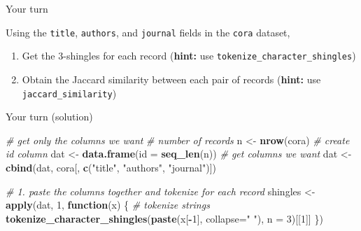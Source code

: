 \documentclass[
  ignorenonframetext,
]{beamer}
\newenvironment{Shaded}{\begin{snugshade}}{\end{snugshade}}
\newcommand{\CommentTok}[1]{\textcolor[rgb]{0.56,0.35,0.01}{\textit{#1}}}
\newcommand{\ControlFlowTok}[1]{\textcolor[rgb]{0.13,0.29,0.53}{\textbf{#1}}}
\newcommand{\DataTypeTok}[1]{\textcolor[rgb]{0.13,0.29,0.53}{#1}}
\newcommand{\DecValTok}[1]{\textcolor[rgb]{0.00,0.00,0.81}{#1}}
\newcommand{\KeywordTok}[1]{\textcolor[rgb]{0.13,0.29,0.53}{\textbf{#1}}}
\newcommand{\NormalTok}[1]{#1}
\newcommand{\OperatorTok}[1]{\textcolor[rgb]{0.81,0.36,0.00}{\textbf{#1}}}
\newcommand{\StringTok}[1]{\textcolor[rgb]{0.31,0.60,0.02}{#1}}
\providecommand{\tightlist}{%
  \setlength{\itemsep}{0pt}\setlength{\parskip}{0pt}}
\begin{document}
\begin{frame}[fragile]{Your turn}
\protect\hypertarget{your-turn-1}{}

Using the \texttt{title}, \texttt{authors}, and \texttt{journal} fields
in the \texttt{cora} dataset,

\vfill

\begin{enumerate}
\tightlist
\item
  Get the \(3\)-shingles for each record (\textbf{hint:} use
  \texttt{tokenize\_character\_shingles}) \vfill
\item
  Obtain the Jaccard similarity between each pair of records
  (\textbf{hint:} use \texttt{jaccard\_similarity}) \vfill
\end{enumerate}

\end{frame}

\begin{frame}[fragile]{Your turn (solution)}
\protect\hypertarget{your-turn-solution-1}{}

\small

\begin{Shaded}
\begin{Highlighting}[]
\CommentTok{# get only the columns we want}
\CommentTok{# number of records}
\NormalTok{n <-}\StringTok{ }\KeywordTok{nrow}\NormalTok{(cora) }
\CommentTok{# create id column}
\NormalTok{dat <-}\StringTok{ }\KeywordTok{data.frame}\NormalTok{(}\DataTypeTok{id =} \KeywordTok{seq_len}\NormalTok{(n)) }
\CommentTok{# get columns we want}
\NormalTok{dat <-}\StringTok{ }\KeywordTok{cbind}\NormalTok{(dat, cora[, }\KeywordTok{c}\NormalTok{(}\StringTok{"title"}\NormalTok{, }\StringTok{"authors"}\NormalTok{, }\StringTok{"journal"}\NormalTok{)])}

\CommentTok{# 1. paste the columns together and tokenize for each record}
\NormalTok{shingles <-}\StringTok{ }\KeywordTok{apply}\NormalTok{(dat, }\DecValTok{1}\NormalTok{, }\ControlFlowTok{function}\NormalTok{(x) \{}
  \CommentTok{# tokenize strings}
  \KeywordTok{tokenize_character_shingles}\NormalTok{(}\KeywordTok{paste}\NormalTok{(x[}\OperatorTok{-}\DecValTok{1}\NormalTok{], }\DataTypeTok{collapse=}\StringTok{" "}\NormalTok{), }\DataTypeTok{n =} \DecValTok{3}\NormalTok{)[[}\DecValTok{1}\NormalTok{]]}
\NormalTok{\})}
\end{Highlighting}
\end{Shaded}

\end{frame}
\end{document}
